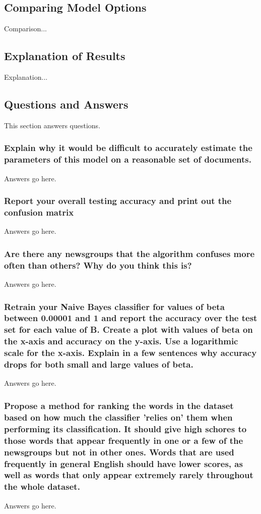 \documentclass{IEEEtran}
\begin{document}
\subsection{Comparing Model Options}
Comparison...

\subsection{Explanation of Results}
Explanation...

\subsection{Questions and Answers}
This section answers questions.

\subsubsection{Explain why it would be difficult to accurately estimate the parameters of this model on a reasonable set of documents.}
Answers go here.

\subsubsection{Report your overall testing accuracy and print out the confusion matrix}
Answers go here.

\subsubsection{Are there any newsgroups that the algorithm confuses more often than others? Why do you think this is?}
Answers go here.

\subsubsection{Retrain your Naive Bayes classifier for values of beta between 0.00001 and 1 and report the accuracy over the test set for each value of B. Create a plot with values of beta on the x-axis and accuracy on the y-axis. Use a logarithmic scale for the x-axis. Explain in a few sentences why accuracy drops for both small and large values of beta.}
Answers go here.

\subsubsection{Propose a method for ranking the words in the dataset based on how much the classifier 'relies on' them when performing its classification. It should give high schores to those words that appear frequently in one or a few of the newsgroups but not in other ones. Words that are used frequently in general English should have lower scores, as well as words that only appear extremely rarely throughout the whole dataset.}
Answers go here.
\end{document}
